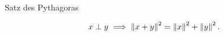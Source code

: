 \documentclass[class=article, crop=false]{standalone}
\begin{document}
\begin{zettel}{Satz des Pythagoras}
\begin{flashcard}[]{}
	\begin{theorem}
		\[
			x \perp y \implies \left\|x+y\right\|^2 = \left\|x\right\|^2 + \left\|y\right\|^2
		.\]
	\end{theorem}
\end{flashcard}
\end{zettel}
\end{document}

